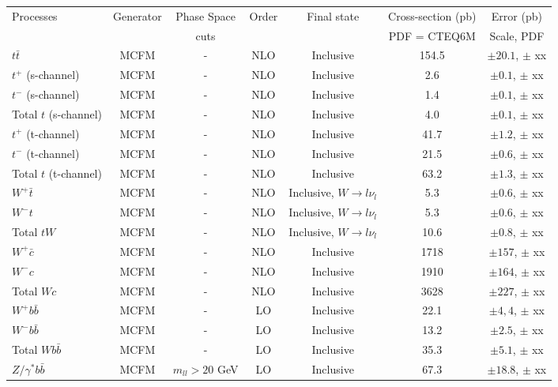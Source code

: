 \vspace{3mm}
\begin{table}[hbt]
\begin{center}
\renewcommand{\arraystretch}{1.2}
\begin{tabular}{|l|c|c|c|c|c|c|}\hline
Processes & Generator & Phase Space& Order & Final state & Cross-section (pb)& Error (pb) \\ 
 &  &  cuts & & & PDF = CTEQ6M & Scale, PDF \\ \hline
$t\bar{t}$ & MCFM & - & NLO & Inclusive & 154.5 & $\pm 20.1$, $\pm$ xx \\ \hline
$t^+$ (s-channel) & MCFM & - & NLO & Inclusive & 2.6 & $\pm 0.1$, $\pm$ xx \\ \hline
$t^-$ (s-channel) & MCFM & - & NLO & Inclusive & 1.4 & $\pm 0.1$, $\pm$ xx \\ \hline
Total $t$ (s-channel) & MCFM & - & NLO & Inclusive & 4.0 & $\pm 0.1$, $\pm$ xx \\ \hline
$t^+$ (t-channel) & MCFM & - & NLO & Inclusive & 41.7 & $\pm 1.2$, $\pm$ xx \\ \hline
$t^-$ (t-channel) & MCFM & - & NLO & Inclusive & 21.5 & $\pm 0.6$, $\pm$ xx \\ \hline
Total $t$ (t-channel) & MCFM & - & NLO & Inclusive & 63.2 & $\pm 1.3$, $\pm$ xx \\ \hline
$W^+ \bar{t}$ & MCFM & - & NLO & Inclusive, $W\rightarrow l \nu_l$ & 5.3 & $\pm 0.6$, $\pm$ xx \\ \hline
$W^- t$ & MCFM & - & NLO & Inclusive, $W\rightarrow l \nu_l$ & 5.3 & $\pm 0.6$, $\pm$ xx \\ \hline
Total $tW$ & MCFM & - & NLO & Inclusive, $W\rightarrow l \nu_l$ & 10.6 & $\pm 0.8$, $\pm$ xx \\ \hline
$W^+ \bar{c}$ & MCFM & - & NLO & Inclusive & 1718 & $\pm 157$, $\pm$ xx \\ \hline
$W^- c$ & MCFM & - & NLO & Inclusive & 1910 & $\pm 164$, $\pm$ xx \\ \hline
Total $Wc$ & MCFM & - & NLO & Inclusive & 3628 & $\pm 227$, $\pm$ xx \\ \hline
$W^+ b\bar{b}$ & MCFM & - & LO & Inclusive & 22.1 & $\pm 4,4$, $\pm$ xx \\ \hline
$W^- b\bar{b}$ & MCFM & - & LO & Inclusive & 13.2 & $\pm 2.5$, $\pm$ xx \\ \hline
Total $Wb\bar{b}$ & MCFM & - & LO & Inclusive & 35.3 & $\pm 5.1$, $\pm$ xx \\ \hline
$Z/\gamma^* b\bar{b}$ & MCFM & $m_{ll} > 20$ GeV & LO & Inclusive & 67.3 & $\pm 18.8$, $\pm$ xx \\ \hline

\end{tabular}
\end{center}
\end{table}
